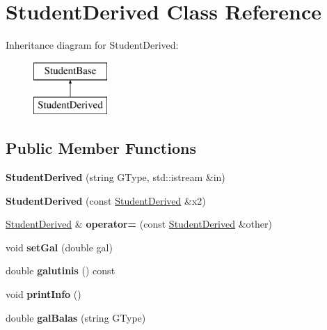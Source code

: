 \hypertarget{class_student_derived}{}\section{Student\+Derived Class Reference}
\label{class_student_derived}
Inheritance diagram for Student\+Derived\+:\begin{figure}[H]
\begin{center}
\leavevmode
\includegraphics[height=2.000000cm]{class_student_derived}
\end{center}
\end{figure}
\subsection*{Public Member Functions}
\begin{DoxyCompactItemize}
\item 
\mbox{\label{class_student_derived_af12515789cf9d27708d8702eae76b0fd}} 
{\bfseries Student\+Derived} (string G\+Type, std\+::istream \&in)
\item 
\mbox{\label{class_student_derived_ab3424c39db6405828691800f395ba06b}} 
{\bfseries Student\+Derived} (const \mbox{\hyperlink{class_student_derived}{Student\+Derived}} \&x2)
\item 
\mbox{\label{class_student_derived_aec705037a02dabdf675f62420d5fd611}} 
\mbox{\hyperlink{class_student_derived}{Student\+Derived}} \& {\bfseries operator=} (const \mbox{\hyperlink{class_student_derived}{Student\+Derived}} \&other)
\item 
\mbox{\label{class_student_derived_a62c621c84c78a94a6e8ad53e03e9c3ef}} 
void {\bfseries set\+Gal} (double gal)
\item 
\mbox{\label{class_student_derived_a44e33a50e90bd21a1b161d67277789f3}} 
double {\bfseries galutinis} () const
\item 
\mbox{\label{class_student_derived_a7c84acecf565c70e2a6d4bfd1c60f7c1}} 
void {\bfseries print\+Info} ()
\item 
\mbox{\label{class_student_derived_acb9c9b9d95bb6a3aaed81ee576fa14cb}} 
double {\bfseries gal\+Balas} (string G\+Type)
\end{DoxyCompactItemize}
